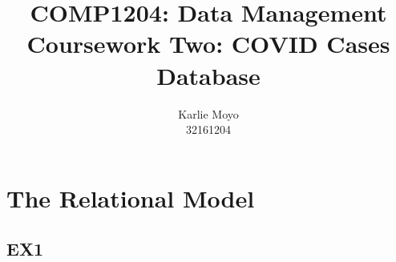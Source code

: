 \documentclass[12pt,oneside,a4paper,english]{article}
\begin{document}
\title{COMP1204: Data Management \\ Coursework Two: COVID Cases Database }
\author{Karlie Moyo \\ 32161204}
\maketitle

\maketitle

\section{The Relational Model}

\subsection{EX1}
\small
\end{document}
